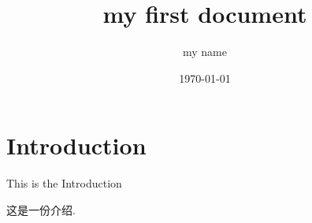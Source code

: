 \documentclass[a4paper,12pt]{article}
\begin{document}
\title{my first document}
\author{my name}
\date{\today}
\maketitle

\tableofcontents
\newpage
{}


\section{Introduction}
This is the Introduction

这是一份介绍.
\end{document}
